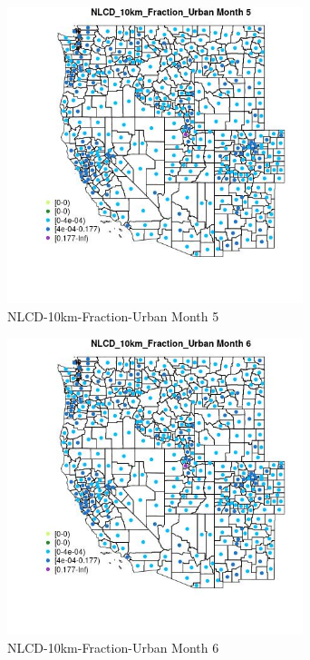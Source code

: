 \begin{figure} 
\centering  
\includegraphics[width=0.77\textwidth]{Code_Outputs/df_report_ML_predictors_CountyCentroid_Locations_Dates_2008-01-01to2018-12-31_MapObsMo5NLCD_10km_Fraction_Urban.jpg} 
\caption{\label{fig:df_report_ML_predictors_CountyCentroid_Locations_Dates_2008-01-01to2018-12-31MapObsMo5NLCD_10km_Fraction_Urban}NLCD-10km-Fraction-Urban Month 5} 
\end{figure} 
 

\begin{figure} 
\centering  
\includegraphics[width=0.77\textwidth]{Code_Outputs/df_report_ML_predictors_CountyCentroid_Locations_Dates_2008-01-01to2018-12-31_MapObsMo6NLCD_10km_Fraction_Urban.jpg} 
\caption{\label{fig:df_report_ML_predictors_CountyCentroid_Locations_Dates_2008-01-01to2018-12-31MapObsMo6NLCD_10km_Fraction_Urban}NLCD-10km-Fraction-Urban Month 6} 
\end{figure} 
 

